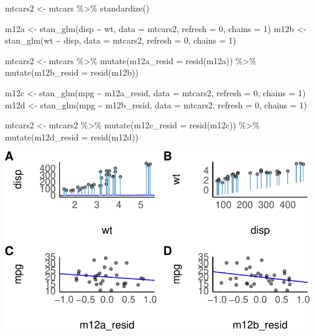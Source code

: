 \documentclass[
  a4paper,
  DIV=11]{scrreprt}
\newenvironment{Shaded}{\begin{snugshade}}{\end{snugshade}}
\newcommand{\AttributeTok}[1]{\textcolor[rgb]{0.40,0.45,0.13}{#1}}
\newcommand{\DecValTok}[1]{\textcolor[rgb]{0.68,0.00,0.00}{#1}}
\newcommand{\FunctionTok}[1]{\textcolor[rgb]{0.28,0.35,0.67}{#1}}
\newcommand{\NormalTok}[1]{\textcolor[rgb]{0.00,0.23,0.31}{#1}}
\newcommand{\OtherTok}[1]{\textcolor[rgb]{0.00,0.23,0.31}{#1}}
\newcommand{\SpecialCharTok}[1]{\textcolor[rgb]{0.37,0.37,0.37}{#1}}
\theoremstyle{definition}
\theoremstyle{remark}
\begin{document}
\begin{Shaded}
\begin{Highlighting}[]
\NormalTok{mtcars2 }\OtherTok{\textless{}{-}}
\NormalTok{  mtcars }\SpecialCharTok{\%\textgreater{}\%} 
  \FunctionTok{standardize}\NormalTok{()}

\NormalTok{m12a }\OtherTok{\textless{}{-}} \FunctionTok{stan\_glm}\NormalTok{(disp }\SpecialCharTok{\textasciitilde{}}\NormalTok{ wt, }\AttributeTok{data =}\NormalTok{ mtcars2, }\AttributeTok{refresh =} \DecValTok{0}\NormalTok{, }\AttributeTok{chains =} \DecValTok{1}\NormalTok{)}
\NormalTok{m12b }\OtherTok{\textless{}{-}} \FunctionTok{stan\_glm}\NormalTok{(wt }\SpecialCharTok{\textasciitilde{}}\NormalTok{ disp, }\AttributeTok{data =}\NormalTok{ mtcars2, }\AttributeTok{refresh =} \DecValTok{0}\NormalTok{, }\AttributeTok{chains =} \DecValTok{1}\NormalTok{)}

\NormalTok{mtcars2 }\OtherTok{\textless{}{-}}
\NormalTok{  mtcars }\SpecialCharTok{\%\textgreater{}\%} 
  \FunctionTok{mutate}\NormalTok{(}\AttributeTok{m12a\_resid =} \FunctionTok{resid}\NormalTok{(m12a)) }\SpecialCharTok{\%\textgreater{}\%} 
  \FunctionTok{mutate}\NormalTok{(}\AttributeTok{m12b\_resid =} \FunctionTok{resid}\NormalTok{(m12b))}


\NormalTok{m12c }\OtherTok{\textless{}{-}} \FunctionTok{stan\_glm}\NormalTok{(mpg }\SpecialCharTok{\textasciitilde{}}\NormalTok{ m12a\_resid, }\AttributeTok{data =}\NormalTok{ mtcars2, }\AttributeTok{refresh =} \DecValTok{0}\NormalTok{, }\AttributeTok{chains =} \DecValTok{1}\NormalTok{)}
\NormalTok{m12d }\OtherTok{\textless{}{-}} \FunctionTok{stan\_glm}\NormalTok{(mpg }\SpecialCharTok{\textasciitilde{}}\NormalTok{ m12b\_resid, }\AttributeTok{data =}\NormalTok{ mtcars2, }\AttributeTok{refresh =} \DecValTok{0}\NormalTok{, }\AttributeTok{chains =} \DecValTok{1}\NormalTok{)}


\NormalTok{mtcars2 }\OtherTok{\textless{}{-}}
\NormalTok{  mtcars2 }\SpecialCharTok{\%\textgreater{}\%} 
  \FunctionTok{mutate}\NormalTok{(}\AttributeTok{m12c\_resid =} \FunctionTok{resid}\NormalTok{(m12c)) }\SpecialCharTok{\%\textgreater{}\%} 
  \FunctionTok{mutate}\NormalTok{(}\AttributeTok{m12d\_resid =} \FunctionTok{resid}\NormalTok{(m12d))}
\end{Highlighting}
\end{Shaded}

\includegraphics{./metrische-AV_files/figure-pdf/resid-lm-plot-mtcars-1.pdf}
\end{document}
